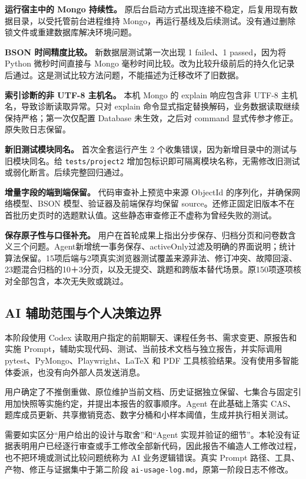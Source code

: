\documentclass[UTF8,10pt,a4paper,twocolumn,fontset=none]{ctexart}
\newcommand{\term}[1]{\textbf{#1}}
\begin{document}
\term{运行宿主中的 Mongo 持续性。} 原后台启动方式出现连接不稳定，后复用现有数据目录，以受托管前台进程维持 Mongo，再运行基线及后续测试。没有通过删除锁文件或重建数据库解决环境问题。

\term{BSON 时间精度比较。} 新数据层测试第一次出现 1 failed、1 passed，因为将 Python 微秒时间直接与 Mongo 毫秒时间比较。改为比较升级前后的持久化记录后通过。这是测试比较方法问题，不能描述为迁移改坏了旧数据。

\term{索引诊断的非 UTF-8 主机名。} 本机 Mongo 的 explain 响应包含非 UTF-8 主机名，导致诊断读取异常。只对 explain 命令显式指定替换解码，业务数据读取继续保持严格；第一次仅配置 Database 未生效，之后对 command 显式传参才修正。原失败日志保留。

\term{新旧测试模块同名。} 首次全套运行产生 2 个收集错误，因为新增目录中的测试与旧模块同名。给 \texttt{tests/project2} 增加包标识即可隔离模块名称，无需修改旧测试或弱化断言。后续完整回归通过。

\term{增量字段的端到端保留。} 代码审查补上预览中来源 ObjectId 的序列化，并确保网络模型、BSON 模型、验证器及前端保存均保留 source。还修正固定旧版本不在首批历史页时的选题默认值。这些静态审查修正不虚称为曾经失败的测试。

\term{保存原子性与口径补充。} 用户在首轮成果上指出分步保存、归档分页和问卷数含义三个问题。Agent新增统一事务保存、activeOnly过滤及明确的界面说明；统计算法保留。15项后端与2项真实浏览器测试覆盖来源非法、修订冲突、故障回滚、23题混合归档的10＋3分页，以及无提交、跳题和跨版本替代场景。原150项逐项核对全部包含，本次无失败或跳过。

\subsection{AI 辅助范围与个人决策边界}
本阶段使用 Codex 读取用户指定的前期聊天、课程任务书、需求变更、原报告和实施 Prompt，辅助实现代码、测试、当前技术文档与独立报告，并实际调用 pytest、PyMongo、Playwright、LaTeX 和 PDF 工具核验结果。没有使用多智能体委派，也没有向外部人员发送消息。

用户确定了不推倒重做、原位维护当前文档、历史证据独立保留、七集合与固定引用加快照等实施约定，并提出本报告的叙事顺序。Agent 在此基础上落实 CAS、题库成员更新、共享撤销竞态、数字分桶和小样本阈值，生成并执行相关测试。

需要如实区分“用户给出的设计与取舍”和“Agent 实现并验证的细节”。本轮没有证据表明用户已经逐行审查或手工修改全部新代码，因此报告不编造人工修改过程，也不把环境或测试比较问题统称为 AI 业务逻辑错误。真实 Prompt 路径、工具、产物、修正与证据集中于第二阶段 \texttt{ai-usage-log.md}，原第一阶段日志不修改。
\end{document}
